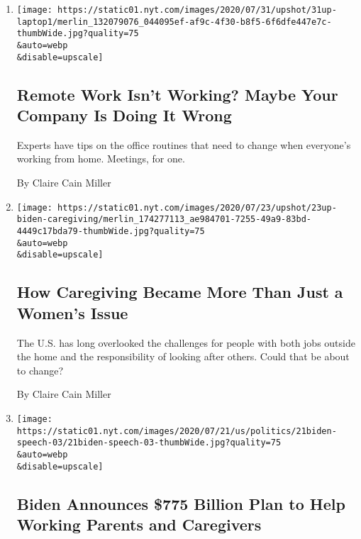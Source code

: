 \begin{enumerate}
\def\labelenumi{\arabic{enumi}.}
\item
  \href{/2020/07/31/upshot/remote-work-tips.html}{}

  \texttt{[image: https://static01.nyt.com/images/2020/07/31/upshot/31up-laptop1/merlin\_132079076\_044095ef-af9c-4f30-b8f5-6f6dfe447e7c-thumbWide.jpg?quality=75\\\&auto=webp\\\&disable=upscale]}

  \hypertarget{remote-work-isnt-working-maybe-your-company-is-doing-it-wrong}{%
  \subsection{Remote Work Isn't Working? Maybe Your Company Is Doing It
  Wrong}\label{remote-work-isnt-working-maybe-your-company-is-doing-it-wrong}}

  Experts have tips on the office routines that need to change when
  everyone's working from home. Meetings, for one.

  By Claire Cain Miller
\item
  \href{/2020/07/23/upshot/biden-caregiving-plan.html}{}

  \texttt{[image: https://static01.nyt.com/images/2020/07/23/upshot/23up-biden-caregiving/merlin\_174277113\_ae984701-7255-49a9-83bd-4449c17bda79-thumbWide.jpg?quality=75\\\&auto=webp\\\&disable=upscale]}

  \hypertarget{how-caregiving-became-more-than-just-a-womens-issue}{%
  \subsection{How Caregiving Became More Than Just a Women's
  Issue}\label{how-caregiving-became-more-than-just-a-womens-issue}}

  The U.S. has long overlooked the challenges for people with both jobs
  outside the home and the responsibility of looking after others. Could
  that be about to change?

  By Claire Cain Miller
\item
  \href{/2020/07/21/us/politics/biden-workplace-childcare.html}{}

  \texttt{[image: https://static01.nyt.com/images/2020/07/21/us/politics/21biden-speech-03/21biden-speech-03-thumbWide.jpg?quality=75\\\&auto=webp\\\&disable=upscale]}

  \hypertarget{biden-announces-775-billion-plan-to-help-working-parents-and-caregivers}{%
  \subsection{Biden Announces \$775 Billion Plan to Help Working Parents
  and
  Caregivers}\label{biden-announces-775-billion-plan-to-help-working-parents-and-caregivers}}


\end{enumerate}
